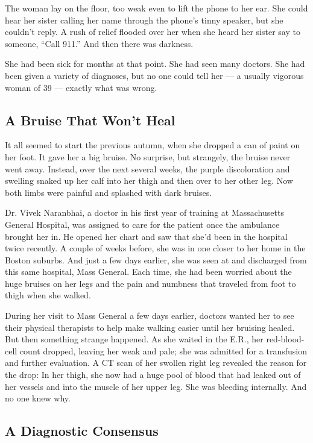 The woman lay on the floor, too weak even to lift the phone to her ear.
She could hear her sister calling her name through the phone's tinny
speaker, but she couldn't reply. A rush of relief flooded over her when
she heard her sister say to someone, ``Call 911.'' And then there was
darkness.

She had been sick for months at that point. She had seen many doctors.
She had been given a variety of diagnoses, but no one could tell her ---
a usually vigorous woman of 39 --- exactly what was wrong.

\hypertarget{a-bruise-that-wont-heal}{%
\subsection{\texorpdfstring{\textbf{A Bruise That Won't
Heal}}{A Bruise That Won't Heal}}\label{a-bruise-that-wont-heal}}

It all seemed to start the previous autumn, when she dropped a can of
paint on her foot. It gave her a big bruise. No surprise, but strangely,
the bruise never went away. Instead, over the next several weeks, the
purple discoloration and swelling snaked up her calf into her thigh and
then over to her other leg. Now both limbs were painful and splashed
with dark bruises.

Dr. Vivek Naranbhai, a doctor in his first year of training at
Massachusetts General Hospital, was assigned to care for the patient
once the ambulance brought her in. He opened her chart and saw that
she'd been in the hospital twice recently. A couple of weeks before, she
was in one closer to her home in the Boston suburbs. And just a few days
earlier, she was seen at and discharged from this same hospital, Mass
General. Each time, she had been worried about the huge bruises on her
legs and the pain and numbness that traveled from foot to thigh when she
walked.

During her visit to Mass General a few days earlier, doctors wanted her
to see their physical therapists to help make walking easier until her
bruising healed. But then something strange happened. As she waited in
the E.R., her red-blood-cell count dropped, leaving her weak and pale;
she was admitted for a transfusion and further evaluation. A CT scan of
her swollen right leg revealed the reason for the drop: In her thigh,
she now had a huge pool of blood that had leaked out of her vessels and
into the muscle of her upper leg. She was bleeding internally. And no
one knew why.

\hypertarget{a-diagnostic-consensus}{%
\subsection{\texorpdfstring{\textbf{A Diagnostic
Consensus}}{A Diagnostic Consensus}}\label{a-diagnostic-consensus}}

